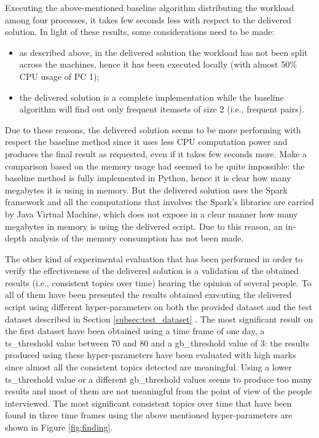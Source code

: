 Executing the above-mentioned baseline algorithm distributing the workload among four processes, it takes few seconds less with respect to the delivered solution. In light of these results, some considerations need to be made:
\begin{itemize}
	\item as described above, in the delivered solution the workload has not been split across the machines, hence it has been executed locally (with almost 50\% CPU usage of PC 1);
	\item the delivered solution is a complete implementation while the baseline algorithm will find out only frequent itemsets of size 2 (i.e., frequent pairs).
\end{itemize}
Due to these reasons, the delivered solution seems to be more performing with respect the baseline method since it uses less CPU computation power and produces the final result as requested, even if it takes few seconds more. Make a comparison based on the memory usage had seemed to be quite impossible: the baseline method is fully implemented in Python, hence it is clear how many megabytes it is using in memory. But the delivered solution uses the Spark framework and all the computations that involves the Spark's libraries are carried by Java Virtual Machine, which does not expose in a clear manner how many megabytes in memory is using the delivered script. Due to this reason, an in-depth analysis of the memory consumption has not been made.

The other kind of experimental evaluation that has been performed in order to verify the effectiveness of the delivered solution is a validation of the obtained results (i.e., consistent topics over time) hearing the opinion of several people. To all of them have been presented the results obtained executing the delivered script using different hyper-parameters on both the provided dataset \cite{covid19-tweets-dataset} and the test dataset described in Section \ref{subsec:test_dataset} \cite{sentiment-analysis-dataset}. The most significant result on the first dataset have been obtained using a time frame of one day, a ts\_threshold value between 70 and 80 and a gb\_threshold value of 3: the results produced using these hyper-parameters have been evaluated with high marks since almost all the consistent topics detected are meaningful. Using a lower ts\_threshold value or a different gb\_threshold values seems to produce too many results and most of them are not meaningful from the point of view of the people interviewed. The most significant consistent topics over time that have been found in three time frames using the above mentioned hyper-parameters are shown in Figure \ref{fig:finding}.

